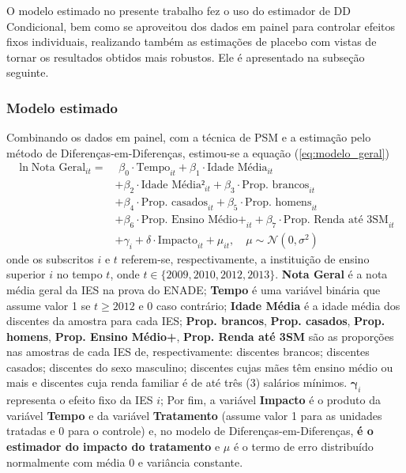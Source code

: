 O modelo estimado no presente trabalho fez o uso do estimador de DD Condicional, bem como se aproveitou dos dados em painel para controlar efeitos fixos individuais, realizando também as estimações de placebo com vistas de tornar os resultados obtidos mais robustos. Ele é apresentado na subseção seguinte.

\subsubsection{Modelo estimado}

Combinando os dados em painel, com a técnica de PSM e a estimação pelo método de Diferenças-em-Diferenças, estimou-se a equação (\ref{eq:modelo_geral})
\begin{equation} \label{eq:modelo_geral} \tag{3.1.8}
    \begin{aligned}
\ln \text{Nota Geral} _{it} = & \,\,\beta_0 \cdot \text{Tempo} _{it} + \beta_1 \cdot \text{Idade Média} _{it} \nonumber \\ &+ \beta_2 \cdot \text{Idade Média²} _{it} \nonumber + \beta_3 \cdot \text{Prop. brancos} _{it} \nonumber \\ &+ \beta_4 \cdot \text{Prop. casados} _{it} \nonumber + \beta_5 \cdot \text{Prop. homens} _{it} \nonumber \\ &+ \beta_6 \cdot \text{Prop. Ensino Médio+} _{it} + \beta_7 \cdot \text{Prop. Renda até 3SM} _{it} \nonumber \\ &+\gamma_i + \delta \cdot \text{Impacto} _{it} + \mu_{it}, \quad \mu \sim \mathcal{N}(0, \sigma^2)
   \end{aligned} 
\end{equation}
onde os subscritos $i$ e $t$ referem-se, respectivamente, a instituição de ensino superior $i$ no tempo $t$, onde $t \in \{2009,2010,2012,2013\}$. \textbf{Nota Geral} é a nota média geral da IES na prova do ENADE; \textbf{Tempo} é uma variável binária que assume valor 1 se $t \geq 2012$ e 0 caso contrário; \textbf{Idade Média} é a idade média dos discentes da amostra para cada IES; \textbf{Prop. brancos}, \textbf{Prop. casados}, \textbf{Prop. homens}, \textbf{Prop. Ensino Médio+}, \textbf{Prop. Renda até 3SM} são as proporções nas amostras de cada IES de, respectivamente: discentes brancos; discentes casados; discentes do sexo masculino; discentes cujas mães têm ensino médio ou mais e discentes cuja renda familiar é de até três (3) salários mínimos. $\bm{\gamma}_i$ representa o efeito fixo da IES $i$; Por fim, a variável \textbf{Impacto} é o produto da variável \textbf{Tempo} e da variável \textbf{Tratamento} (assume valor 1 para as unidades tratadas e 0 para o controle) e, no modelo de Diferenças-em-Diferenças, \textbf{é o estimador do impacto do tratamento} e $\mu$ é o termo de erro distribuído normalmente com média 0 e variância constante.

